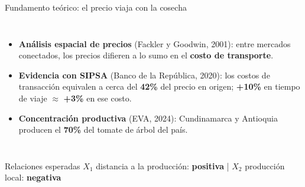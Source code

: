 \documentclass[aspectratio=169,11pt]{beamer}
\newcommand{\cifra}[1]{{\color{tomate}\bfseries #1}}
\begin{document}
\begin{frame}{Fundamento teórico: el precio viaja con la cosecha}
  \begin{columns}[c]
    \begin{itemize}\small
      \item \textbf{Análisis espacial de precios} (Fackler y Goodwin, 2001): entre mercados
            conectados, los precios difieren a lo sumo en el \textbf{costo de transporte}.
      \item \textbf{Evidencia con SIPSA} (Banco de la República, 2020): los costos de
            transacción equivalen a cerca del \cifra{42\%} del precio en origen; \cifra{+10\%}
            en tiempo de viaje $\approx$ \cifra{+3\%} en ese costo.
      \item \textbf{Concentración productiva} (EVA, 2024): Cundinamarca y Antioquia producen
            el \cifra{70\%} del tomate de árbol del país.
    \end{itemize}
  \end{columns}
  \vspace{0.2cm}
  \begin{exampleblock}{Relaciones esperadas}\small
    $X_1$ distancia a la producción: \textbf{positiva} \quad|\quad
    $X_2$ producción local: \textbf{negativa}
  \end{exampleblock}
\end{frame}

\end{document}
